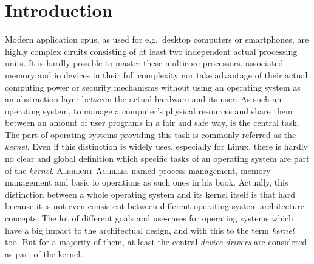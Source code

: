 
\chapter{Introduction}\label{ch:introduction}



Modern application \acp{cpu}, as used for e.g.\ desktop computers or smartphones, are highly complex ciruits consisting of at least two independent actual processing units.
It is hardly possible to master these multicore processors, associated memory and \ac{io} devices in their full complexity nor take advantage of their actual computing power or security mechanisms without using an operating system as an abstraction layer between the actual hardware and its user.
As such an operating system, to manage a computer's physical resources and share them between an amount of user programs in a fair and safe way, is the central task.
The part of operating systems providing this task is commonly referred as the \textit{kernel}.  
Even if this distinction is widely uses, especially for Linux, there is hardly no clear and global definition which specific tasks of an operating system are part of the \textit{kernel}.
\textsc{Albrecht Achilles} named process management, memory management and basic \ac{io} operations as such ones in his book\cite{achilles2006betriebssysteme}.
Actually, this distinction between a whole operating system and its kernel itself is that hard because it is not even consistent between different operating system architecture concepts.
The lot of different goals and use-cases for operating systems which have a big impact to the architectual design, and with this to the term \textit{kernel} too. 
But for a majority of them, at least the central \textit{device drivers} are considered as part of the kernel. 

